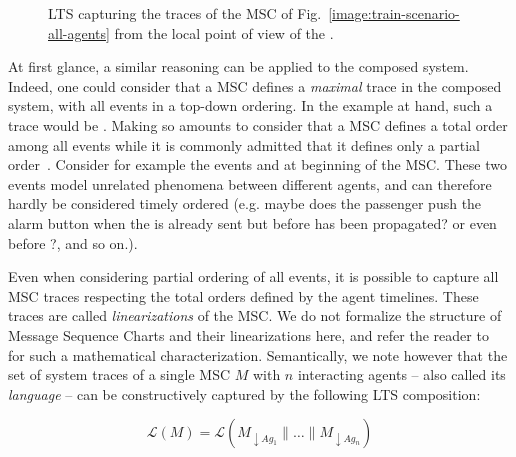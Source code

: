 \vspace{0.5cm}
\begin{figure}[H]\centering
{}
\caption{LTS capturing the traces of the MSC of Fig.~\ref{image:train-scenario-all-agents} from the local point of view of the .\label{image:local-traces-lts}}
\end{figure}

At first glance, a similar reasoning can be applied to the composed system. Indeed, one could consider that a MSC defines a \emph{maximal} trace in the composed system, with all events in a top-down ordering. In the example at hand, such a trace would be . Making so amounts to consider that a MSC defines a total order among all events while it is commonly admitted that it defines only a partial order~\cite{ITU:1996, Uchitel:2003}. Consider for example the events  and  at beginning of the MSC. These two events model unrelated phenomena between different agents, and can therefore hardly be considered timely ordered (e.g. maybe does the passenger push the alarm button when the  is already sent but before  has been propagated? or even before ?, and so on.). 

Even when considering partial ordering of all events, it is possible to capture all MSC traces respecting the total orders defined by the agent timelines. These traces are called \emph{linearizations} of the MSC. We do not formalize the structure of Message Sequence Charts and their linearizations here, and refer the reader to~\cite{Uchitel:2003} for such a mathematical characterization. Semantically, we note however that the set of system traces of a single MSC $M$ with $n$ interacting agents -- also called its \emph{language} -- can be constructively captured by the following LTS composition:

\begin{equation}
\label{equation:msc-composition}
\mathcal{L}(M) = \mathcal{L}(M_{\downarrow Ag_1} \parallel \ldots \parallel M_{\downarrow Ag_n})
\end{equation}

